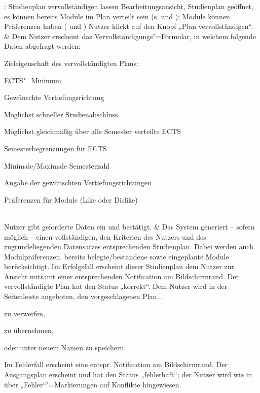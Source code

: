 \begin{usecase}{: Studienplan vervollständigen lassen}
	{Bearbeitungsansicht, Studienplan geöffnet, es können bereits Module im Plan verteilt sein (s.  und ); Module können Präferenzen haben ( und )}
	Nutzer klickt auf den Knopf „Plan vervollständigen“.
	& Dem Nutzer erscheint das Vervollständigungs"=Formular, in welchem folgende Daten abgefragt werden:
	\begin{tblitemize}
		\item Zieleigenschaft des vervollständigten Plans:
		\begin{tblitemize}
			\item ECTS"=Minimum
			\item Gewünschte Vertiefungsrichtung
			\item Möglichst schneller Studienabschluss
			\item Möglichst gleichmäßig über alle Semester verteilte ECTS
		\end{tblitemize}
		\item Semesterbegrenzungen für ECTS
		\item Minimale/Maximale Semesterzahl
		\item Angabe der gewünschten Vertiefungsrichtungen
		\item Präferenzen für Module (Like oder Dislike)
	\end{tblitemize} \\
	\hline
	Nutzer gibt geforderte Daten ein und bestätigt.
	& Das System generiert – sofern möglich – einen vollständigen, den Kriterien des Nutzers und des zugrundeliegenden Datensatzes entsprechenden Studienplan. Dabei werden auch Modulpräferenzen, bereits belegte/bestandene sowie eingeplante Module berücksichtigt. \newline
	Im Erfolgsfall erscheint dieser Studienplan dem Nutzer zur Ansicht mitsamt einer entsprechenden Notification am Bildschirmrand. Der vervollständigte Plan hat den Status „korrekt“. Dem Nutzer wird in der Seitenleiste angeboten, den vorgeschlagenen Plan...
	\begin{tblitemize}
		\item zu verwerfen,
		\item zu übernehmen,
		\item oder unter neuem Namen zu speichern.
	\end{tblitemize} \newline
	Im Fehlerfall erscheint eine entspr. Notification am Bildschirmrand. Der Ausgangsplan erscheint und hat den Status „fehlerhaft“; der Nutzer wird wie in  über „Fehler“"=Markierungen auf Konflikte hingewiesen. \\

\end{usecase}

